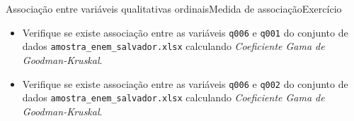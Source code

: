 \documentclass[
  10pt,
  ignorenonframetext,
]{beamer}
\providecommand{\tightlist}{%
  \setlength{\itemsep}{0pt}\setlength{\parskip}{0pt}}\usepackage{longtable,booktabs,array}
\begin{document}
\begin{frame}[fragile]{Associação entre variáveis qualitativas
ordinais\newline Medida de associação\newline Exercício}
\protect\hypertarget{associauxe7uxe3o-entre-variuxe1veis-qualitativas-ordinaismedida-de-associauxe7uxe3oexercuxedcio}{}
\begin{itemize}
\tightlist
\item
  Verifique se existe associação entre as variáveis \texttt{q006} e
  \texttt{q001} do conjunto de dados
  \texttt{amostra\_enem\_salvador.xlsx} calculando \emph{Coeficiente
  Gama de Goodman-Kruskal}.
\item
  Verifique se existe associação entre as variáveis \texttt{q006} e
  \texttt{q002} do conjunto de dados
  \texttt{amostra\_enem\_salvador.xlsx} calculando \emph{Coeficiente
  Gama de Goodman-Kruskal}.
\end{itemize}
\end{frame}
\end{document}
